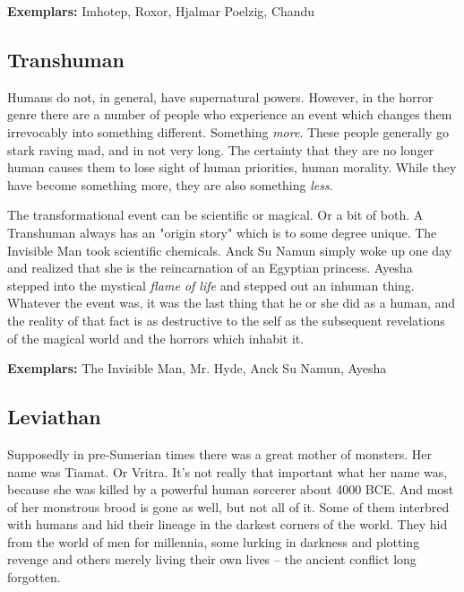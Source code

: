 \textbf{Exemplars:} Imhotep, Roxor, Hjalmar Poelzig, Chandu

\subsection{Transhuman} 

Humans do not, in general, have supernatural powers. However, in the horror genre there are a number of people who experience an event which changes them irrevocably into something different. Something \textit{more}. These people generally go stark raving mad, and in not very long. The certainty that they are no longer human causes them to lose sight of human priorities, human morality. While they have become something more, they are also something \textit{less}.

The transformational event can be scientific or magical. Or a bit of both. A Transhuman always has an "origin story" which is to some degree unique. The Invisible Man took scientific chemicals. Anck Su Namun simply woke up one day and realized that she is the reincarnation of an Egyptian princess. Ayesha stepped into the mystical \textit{flame of life} and stepped out an inhuman thing. Whatever the event was, it was the last thing that he or she did as a human, and the reality of that fact is as destructive to the self as the subsequent  revelations of the magical world and the horrors which inhabit it.

\textbf{Exemplars:} The Invisible Man, Mr. Hyde, Anck Su Namun, Ayesha

\subsection{Leviathan} 

Supposedly in pre-Sumerian times there was a great mother of monsters. Her name was Tiamat. Or Vritra. It's not really that important what her name was, because she was killed by a powerful human sorcerer about 4000 BCE. And most of her monstrous brood is gone as well, but not all of it. Some of them interbred with humans and hid their lineage in the darkest corners of the world. They hid from the world of men for millennia, some lurking in darkness and plotting revenge and others merely living their own lives -- the ancient conflict long forgotten.

